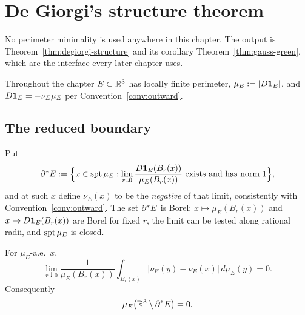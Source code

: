 \chapter{De Giorgi's structure theorem}\label{ch:degiorgi}

No perimeter minimality is used anywhere in this chapter.  The output is
Theorem~\ref{thm:degiorgi-structure} and its corollary
Theorem~\ref{thm:gauss-green}, which are the interface every later chapter
uses.

\begin{notation}\label{not:degiorgi}
Throughout the chapter $E\subset\mathbb R^3$ has locally finite perimeter,
$\mu_E:=|D\mathbf 1_{E}|$, and $D\mathbf 1_{E}=-\nu_E\mu_E$ per
Convention~\ref{conv:outward}.
\end{notation}

\section{The reduced boundary}

\begin{definition}\label{def:reduced-boundary}
Put
\begin{equation}\label{eq:reduced-boundary}
  \partial^* E:=\Bigl\{x\in\operatorname{spt}\mu_E:
    \lim_{r\downarrow0}\frac{D\mathbf 1_{E}(B_r(x))}{\mu_E(B_r(x))}
    \text{ exists and has norm }1\Bigr\},
\end{equation}
and at such $x$ define $\nu_E(x)$ to be the \emph{negative} of that limit,
consistently with Convention~\ref{conv:outward}.
The set $\partial^* E$ is Borel: $x\mapsto\mu_E(B_r(x))$ and
$x\mapsto D\mathbf 1_{E}(B_r(x))$ are Borel for fixed $r$, the limit can be tested
along rational radii, and $\operatorname{spt}\mu_E$ is closed.
\end{definition}

\begin{lemma}\label{lem:polar-differentiation}
For $\mu_E$-a.e.\ $x$,
\begin{equation}\label{eq:polar-differentiation}
  \lim_{r\downarrow0}\frac1{\mu_E(B_r(x))}
    \int_{B_r(x)}|\nu_E(y)-\nu_E(x)|\,d\mu_E(y)=0 .
\end{equation}
Consequently
\begin{equation}\label{eq:reduced-full-measure}
  \mu_E\bigl(\mathbb R^3\setminus\partial^* E\bigr)=0 .
\end{equation}
\end{lemma}

